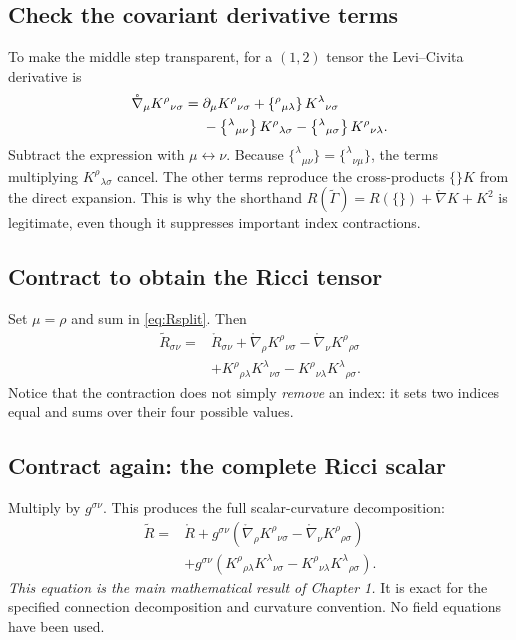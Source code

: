 \documentclass[11pt,a4paper]{article}
\newcommand{\LC}{\mathring{\nabla}}
\newcommand{\RR}{\mathring{R}}
\begin{document}
\subsection{Check the covariant derivative terms}
To make the middle step transparent, for a $(1,2)$ tensor the Levi--Civita derivative is
\begin{align}\label{eq:nablaK}
\LC_\mu K^\rho{}_{\nu\sigma}
={}&\partial_\mu K^\rho{}_{\nu\sigma}+\left\{^\rho{}_{\mu\lambda}\right\}K^\lambda{}_{\nu\sigma}\notag\\
&-\left\{^\lambda{}_{\mu\nu}\right\}K^\rho{}_{\lambda\sigma}-\left\{^\lambda{}_{\mu\sigma}\right\}K^\rho{}_{\nu\lambda}.
\end{align}
Subtract the expression with $\mu\leftrightarrow\nu$. Because $\{^\lambda{}_{\mu\nu}\}=\{^\lambda{}_{\nu\mu}\}$, the terms multiplying $K^\rho{}_{\lambda\sigma}$ cancel. The other terms reproduce the cross-products $\{\}K$ from the direct expansion. This is why the shorthand $R(\widetilde\Gamma)=R(\{\})+\LC K+K^2$ is legitimate, even though it suppresses important index contractions.

\subsection{Contract to obtain the Ricci tensor}
Set $\mu=\rho$ and sum in \eqref{eq:Rsplit}. Then
\begin{equation}\label{eq:Riccisplit}
\boxed{\begin{aligned}
\widetilde R_{\sigma\nu}={}&\RR_{\sigma\nu}
+\LC_\rho K^\rho{}_{\nu\sigma}-\LC_\nu K^\rho{}_{\rho\sigma}\\
&+K^\rho{}_{\rho\lambda}K^\lambda{}_{\nu\sigma}
-K^\rho{}_{\nu\lambda}K^\lambda{}_{\rho\sigma}.
\end{aligned}}
\end{equation}
Notice that the contraction does not simply \emph{remove} an index: it sets two indices equal and sums over their four possible values.

\subsection{Contract again: the complete Ricci scalar}
Multiply by $g^{\sigma\nu}$. This produces the full scalar-curvature decomposition:
\begin{equation}\label{eq:scalardecomp}
\boxed{\begin{aligned}
\widetilde R={}&\RR
+g^{\sigma\nu}\left(\LC_\rho K^\rho{}_{\nu\sigma}-\LC_\nu K^\rho{}_{\rho\sigma}\right)\\
&+g^{\sigma\nu}\left(K^\rho{}_{\rho\lambda}K^\lambda{}_{\nu\sigma}
-K^\rho{}_{\nu\lambda}K^\lambda{}_{\rho\sigma}\right).
\end{aligned}}
\end{equation}
\emph{This equation is the main mathematical result of Chapter 1.} It is exact for the specified connection decomposition and curvature convention. No field equations have been used.
\end{document}
